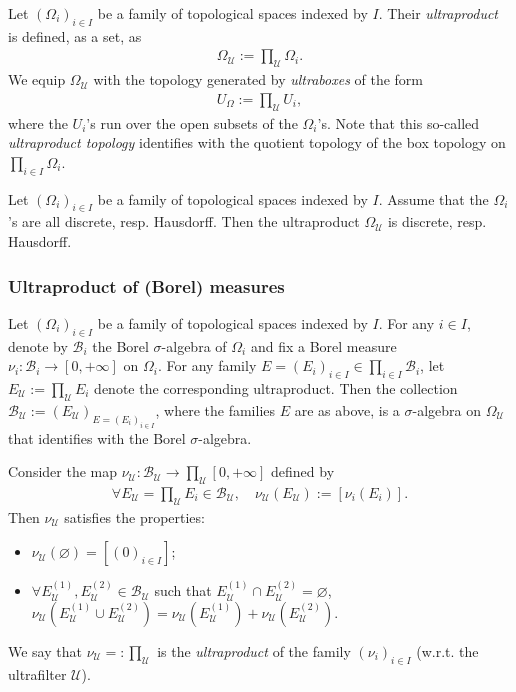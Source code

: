 \documentclass [11pt,reqno]{amsart}
\newcommand{\1}{\mathmybb{1}}
\def\cB{{\mathcal{B}}}
\def\cU{{\mathcal{U}}}
\def\emptyset{\varnothing}
\begin{document}
Let $(\Omega_{i})_{i\in I}$ be a family of topological spaces indexed by $I$. Their \emph{ultraproduct} is defined, as a set, as 
\begin{align*}
\Omega_{\cU} := \displaystyle\prod_{\cU} \Omega_{i}. 
\end{align*}
We equip $\Omega_{\cU}$ with the topology generated by \emph{ultraboxes} of the form 
\begin{align*}
U_{\Omega} := \prod_{\cU} U_{i},
\end{align*}
where the $U_{i}$'s run over the open subsets of the $\Omega_{i}$'s. Note that this so-called \emph{ultraproduct topology} identifies with the quotient topology of the box topology on $\prod_{i\in I}\Omega_{i}$. 

\begin{proposition}
Let $(\Omega_{i})_{i\in I}$ be a family of topological spaces indexed by $I$. Assume that the $\Omega_{i}$'s are all discrete, resp. Hausdorff. Then the ultraproduct $\Omega_{\cU}$ is discrete, resp. Hausdorff. %
\end{proposition}

\subsubsection{Ultraproduct of (Borel) measures}
\label{subsub:ultraproduct_measures}

Let $(\Omega_{i})_{i\in I}$ be a family of topological spaces indexed by $I$. For any $i\in I$, denote by $\cB_{i}$ the Borel $\sigma$-algebra of $\Omega_{i}$ and fix a Borel measure $\nu_{i}:\cB_{i}\to[0,+\infty]$ on $\Omega_{i}$. For any family $E=(E_{i})_{i\in I}\in \prod_{i\in I}\cB_{i}$, let $E_{\cU}:=\prod_{\cU}E_{i}$ denote the corresponding ultraproduct. Then the collection $\cB_{\cU}:=(E_{\cU})_{E=(E_{i})_{i\in I}}$, where the families $E$ are as above, is a $\sigma$-algebra on $\Omega_{\cU}$ that identifies with the Borel $\sigma$-algebra. 

Consider the map $\nu_{\cU} : \cB_{\cU}\to\prod_{\cU}[0,+\infty]$ defined by
\begin{align*}
\forall E_{\cU}=\prod_{\cU}E_{i}\in \cB_{\cU}, \quad  \nu_{\cU}(E_{\cU}) := [\nu_{i}(E_{i})].
\end{align*}
Then $\nu_{\cU}$ satisfies the properties: 
\begin{itemize}
	\item[(i)] $\nu_{\cU}(\emptyset)=[(0)_{i\in I}]$;
	\item[(ii)] $\forall E^{(1)}_{\cU},E^{(2)}_{\cU}\in\cB_{\cU}$ such that $E^{(1)}_{\cU}\cap E^{(2)}_{\cU}=\emptyset$, $\nu_{\cU}(E^{(1)}_{\cU}\cup E^{(2)}_{\cU})=\nu_{\cU}(E^{(1)}_{\cU})+\nu_{\cU}(E^{(2)}_{\cU})$.
\end{itemize}
We say that $\nu_{\cU}=:\prod_{\cU}$ is the \emph{ultraproduct} of the family $(\nu_{i})_{i\in I}$ (w.r.t. the ultrafilter $\cU$). 
\end{document}
